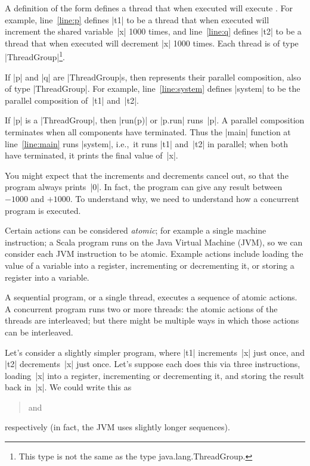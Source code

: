 A definition of the form  defines a
thread that when executed will execute .  For
example, line~\ref{line:p} defines |t1| to be a thread that when executed will
increment the shared variable~|x| 1000 times, and line~\ref{line:q} defines
|t2| to be a thread that when executed will decrement |x| 1000 times.  Each
thread is of type |ThreadGroup|\footnote{This
  type is not the same as the type {\scalashape java.lang.ThreadGroup}.}.

If |p| and |q| are |ThreadGroup|s, then  represents their
parallel composition, also of type |ThreadGroup|.  For example,
line~\ref{line:system} defines |system| to be the parallel composition of~|t1|
and~|t2|.

If |p| is a |ThreadGroup|, then |run(p)| or |p.run| runs~|p|.  A
parallel composition terminates when all components have terminated.  Thus the
|main| function at line~\ref{line:main} runs |system|, i.e.,~it runs |t1|
and~|t2| in parallel; when both have terminated, it prints the final value
of~|x|.

You might expect that the increments and decrements cancel out, so that the
program always prints~|0|.  In fact, the program can give any result between
$-1000$ and $+1000$.
%
To understand why, we need to understand how a concurrent program is
executed. 
 
Certain actions can be considered \emph{atomic}; for
example a single machine instruction; a Scala program runs on the Java Virtual
Machine (JVM), so we can consider each JVM instruction to be
atomic.
Example actions include loading the value of a variable into a
register, incrementing or decrementing it, or storing a register into a
variable.

A sequential program, or a single thread, executes a sequence of atomic
actions.  
%
A concurrent program runs two or more threads: the atomic actions of the
threads are interleaved; but there might be multiple ways in which those
actions can be interleaved.

Let's consider a slightly simpler program, where |t1| increments~|x| just
once, and |t2| decrements~|x| just once.  Let's suppose each does this via three
instructions, loading~|x| into a register, incrementing or decrementing it,
and storing the result back in~|x|.  We could write this as
\begin{quote}
 \qquad and \qquad {}
\end{quote}
respectively (in fact, the JVM uses slightly longer sequences).

